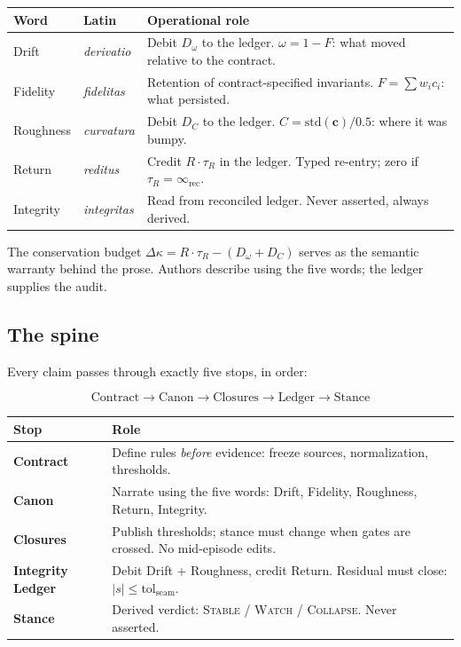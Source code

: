\documentclass[
  aps,
  prd,
  twocolumn,
  superscriptaddress,
  nofootinbib,
  floatfix
]{revtex4-2}
\newcommand{\tR}{\tau_{\!R}}
\newcommand{\IR}{\infty_{\mathrm{rec}}}
\newcommand{\tolseam}{\mathrm{tol}_{\mathrm{seam}}}
\newcommand{\beq}{\begin{equation}}
\newcommand{\eeq}{\end{equation}}
\newcommand{\regime}[1]{\textrm{\scshape#1}}
\newcommand{\tvec}{\mathbf{c}}
\begin{document}
\begin{center}
\begin{tabular}{@{}llP{3.5cm}@{}}
\toprule
Word & Latin & Operational role \\
\midrule
Drift & \textit{derivatio} &
  Debit $D_\omega$ to the ledger.
  $\omega = 1 - F$: what moved relative to the contract. \\[0.3em]
Fidelity & \textit{fidelitas} &
  Retention of contract-specified invariants.
  $F = \sum w_i c_i$: what persisted. \\[0.3em]
Roughness & \textit{curvatura} &
  Debit $D_C$ to the ledger.
  $C = \mathrm{std}(\tvec)/0.5$: where it was bumpy. \\[0.3em]
Return & \textit{reditus} &
  Credit $R \cdot \tR$ in the ledger.
  Typed re-entry; zero if $\tR = \IR$. \\[0.3em]
Integrity & \textit{integritas} &
  Read from reconciled ledger.
  Never asserted, always derived. \\
\bottomrule
\end{tabular}
\end{center}

The conservation budget $\Delta\kappa = R \cdot \tR - (D_\omega
+ D_C)$ serves as the semantic warranty behind the prose.  Authors
describe using the five words; the ledger supplies the audit.

\subsection{The spine}

Every claim passes through exactly five stops, in order:

\beq
\text{Contract} \to \text{Canon} \to \text{Closures}
  \to \text{Ledger} \to \text{Stance}
\eeq

\begin{center}
\begin{tabular}{@{}lP{5cm}@{}}
\toprule
Stop & Role \\
\midrule
\textbf{Contract} &
  Define rules \emph{before} evidence: freeze sources,
  normalization, thresholds. \\[0.3em]
\textbf{Canon} &
  Narrate using the five words: Drift, Fidelity, Roughness,
  Return, Integrity. \\[0.3em]
\textbf{Closures} &
  Publish thresholds; stance must change when gates are
  crossed.  No mid-episode edits. \\[0.3em]
\textbf{Integrity Ledger} &
  Debit Drift + Roughness, credit Return.  Residual must
  close: $|s| \leq \tolseam$. \\[0.3em]
\textbf{Stance} &
  Derived verdict: \regime{Stable} / \regime{Watch} /
  \regime{Collapse}.  Never asserted. \\
\bottomrule
\end{tabular}
\end{center}
\end{document}
